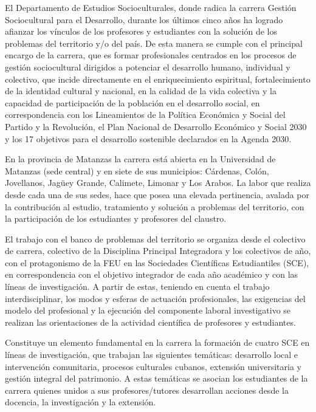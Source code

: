 El Departamento de Estudios Socioculturales, donde radica la carrera Gestión Sociocultural para el Desarrollo, durante los últimos cinco años ha logrado afianzar los vínculos de los profesores y estudiantes con la solución de los problemas del territorio y/o del país. De esta manera se cumple con el principal encargo de la carrera, que es formar profesionales centrados en los procesos de gestión sociocultural dirigidos a potenciar el desarrollo humano, individual y colectivo, que incide directamente en el enriquecimiento espiritual, fortalecimiento de la identidad cultural y nacional, en la calidad de la vida colectiva y la capacidad de participación de la población en el desarrollo social, en correspondencia con los Lineamientos de la Política Económica y Social del Partido y la Revolución, el Plan Nacional de Desarrollo Económico y Social 2030 y los 17 objetivos para el desarrollo sostenible declarados en la Agenda 2030. 

En la provincia de Matanzas la carrera está abierta en la Universidad de Matanzas (sede central) y en siete de sus municipios: Cárdenas, Colón, Jovellanos, Jagüey Grande, Calimete, Limonar y Los Arabos. La labor que realiza desde cada una de sus sedes, hace que posea una elevada pertinencia, avalada por la contribución al estudio, tratamiento y solución a problemas del territorio, con la participación de los estudiantes y profesores del claustro.

El trabajo con el banco de problemas del territorio se organiza desde el colectivo de carrera, colectivo de la Disciplina Principal Integradora y los colectivos de año, con el protagonismo de la FEU en las Sociedades Científicas Estudiantiles (SCE), en correspondencia con el objetivo integrador de cada año académico y con las líneas de investigación. A partir de estas, teniendo en cuenta el trabajo interdisciplinar, los modos y esferas de actuación profesionales, las exigencias del modelo del profesional y la ejecución del componente laboral investigativo se realizan las orientaciones de la actividad científica de profesores y estudiantes.

Constituye un elemento fundamental en la carrera la formación de cuatro SCE en líneas de investigación, que trabajan las siguientes temáticas: desarrollo local e intervención comunitaria, procesos culturales cubanos, extensión universitaria y gestión integral del patrimonio. A estas temáticas se asocian los estudiantes de la carrera quienes unidos a sus profesores/tutores desarrollan acciones desde la docencia, la investigación y la extensión.

